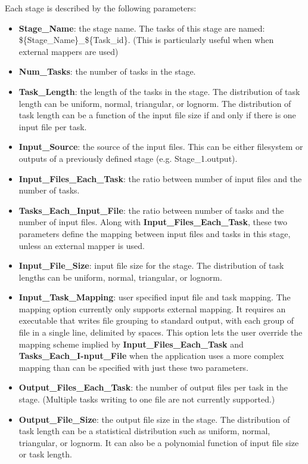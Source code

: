 \documentclass{sig-alternate}
\newenvironment{shortlist}{
        \vspace*{-0.5em}
  \begin{itemize}
  \setlength{\itemsep}{-0.1em}
}{
  \end{itemize}
        \vspace*{-0.5em}
}
\begin{document}
Each stage is described by the following parameters:
\begin{shortlist}
\item{\textbf{Stage\_Name}:} the stage name. The tasks of this stage are named: \$\{Stage\_Name\}\_\$\{Task\_id\}. (This is particularly useful when when external mappers are used)

\item{\textbf{Num\_Tasks}:}  the number of tasks in the stage.

\item{\textbf{Task\_Length}:}  the length of the tasks in the stage. The distribution of task length can be uniform, normal, triangular, or lognorm. The distribution of task length can be a function of the input file size if and only if there is one input file per task. 

\item{\textbf{Input\_Source}:}  the source of the input files.  This can be either filesystem or outputs of a previously defined stage (e.g. Stage\_1.output). 

\item{\textbf{Input\_Files\_Each\_Task}:}  the ratio between number of input files and the number of tasks.

\item{\textbf{Tasks\_Each\_Input\_File}:}  the ratio between number of tasks and the number of input files. Along with \textbf{Input\_Files\_Each\_Task}, these two parameters define the mapping between input files and tasks in this stage, unless an external mapper is used. 

\item{\textbf{Input\_File\_Size}:}  input file size for the stage. The distribution of task lengths can be uniform, normal, triangular, or lognorm. 

\item{\textbf{Input\_Task\_Mapping}:} user specified input file and task mapping. The mapping option currently only supports external mapping. It requires an executable that writes file grouping to standard output, with each group of file in a single line, delimited by spaces. This option lets the user override the mapping scheme implied by \textbf{Input\_Files\_Each\_Task} and \textbf{Tasks\_Each\_I-nput\_File} when the application uses a more complex mapping than can be specified with just these two parameters.

\item{\textbf{Output\_Files\_Each\_Task}:}  the number of output files per task in the stage. (Multiple tasks writing to one file are not currently supported.)

\item{\textbf{Output\_File\_Size}:}  the output file size in the stage. The distribution of task length can be a statistical distribution such as uniform, normal, triangular, or lognorm. It can also be a polynomial function of input file size or task length.

\end{shortlist}
\end{document}
